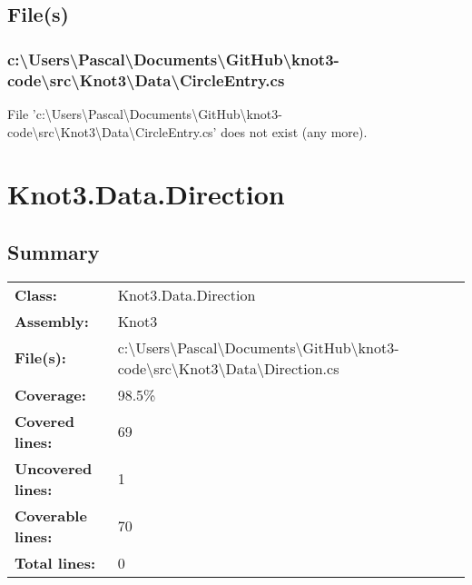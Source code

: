 \documentclass[a4paper,10pt]{article}
\begin{document}
\subsection{File(s)}
\subsubsection{c:\textbackslash Users\textbackslash Pascal\textbackslash Documents\textbackslash GitHub\textbackslash knot3-code\textbackslash src\textbackslash Knot3\textbackslash Data\textbackslash CircleEntry.cs}
 File 'c:\textbackslash Users\textbackslash Pascal\textbackslash Documents\textbackslash GitHub\textbackslash knot3-code\textbackslash src\textbackslash Knot3\textbackslash Data\textbackslash CircleEntry.cs' does not exist (any more).
\newpage
\section{Knot3.Data.Direction}
\subsection{Summary}
\begin{longtable}[l]{ll}
\textbf{Class:} & Knot3.Data.Direction\\
\textbf{Assembly:} & Knot3\\
\textbf{File(s):} & \begin{minipage}[t]{12cm}{c:\textbackslash Users\textbackslash Pascal\textbackslash Documents\textbackslash GitHub\textbackslash knot3-code\textbackslash src\textbackslash Knot3\textbackslash Data\textbackslash Direction.cs}\end{minipage} \\
\textbf{Coverage:} & 98.5\%\\
\textbf{Covered lines:} & 69\\
\textbf{Uncovered lines:} & 1\\
\textbf{Coverable lines:} & 70\\
\textbf{Total lines:} & 0\\
\end{longtable}
\end{document}
